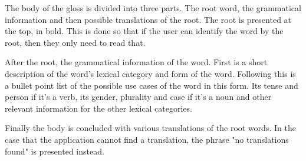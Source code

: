 The body of the gloss is divided into three parts. The root word, the grammatical information and then possible translations of the root. The root is presented at the top, in bold. This is done so that if the user can identify the word by the root, then they only need to read that. 

After the root, the grammatical information of the word. First is a short description of the word's lexical category and form of the word. Following this is a bullet point list of the possible use cases of the word in this form. Its tense and person if it's a verb, its  gender, plurality and case if it's a noun and other relevant information for the other lexical categories. 

Finally the body is concluded with various translations of the root words. In the case that the application cannot find a translation, the phrase "no translations found" is presented instead. 
 